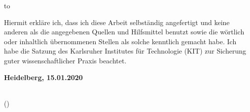 %
%

\thispagestyle{empty}
\vspace*{31\baselineskip}
\hbox to \textwidth{\hrulefill}
\par



Hiermit erkläre ich, dass ich diese Arbeit selbständig angefertigt und keine anderen als
die angegebenen Quellen und Hilfsmittel benutzt sowie die wörtlich oder inhaltlich
übernommenen Stellen als solche kenntlich gemacht habe. Ich habe die Satzung
des Karlsruher Institutes für Technologie (KIT) zur Sicherung guter wissenschaftlicher Praxis beachtet.

\textbf{Heidelberg, 15.01.2020}
\vspace{1.5cm}

\dotfill\hspace*{8.0cm}\\
\hspace*{2cm}(\textbf{\myname}) %

